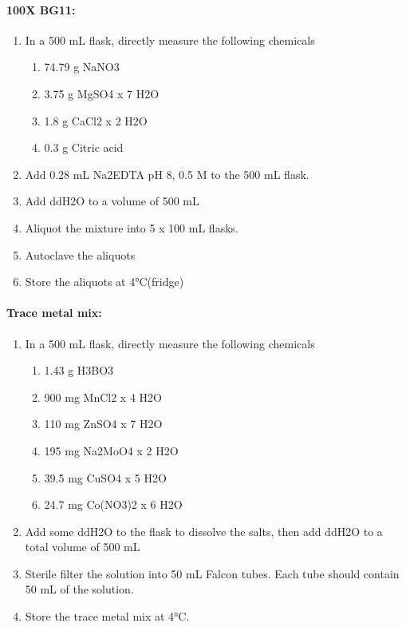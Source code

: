 \paragraph{100X BG11:}
\begin{enumerate}
    \item In a 500 mL flask, directly measure the following chemicals
\begin{enumerate}
    \item 74.79 g 	NaNO3
    \item 3.75 g 		MgSO4 x 7 H2O
    \item 1.8 g 		CaCl2 x 2 H2O
    \item 0.3 g 		Citric acid
\end{enumerate}
\item Add 0.28 mL Na2EDTA pH 8, 0.5 M to the 500 mL flask. 
\item Add ddH2O to a volume of 500 mL
\item Aliquot the mixture into 5 x 100 mL flasks.
\item Autoclave the aliquots 
\item Store the aliquots at 4°C(fridge)
\end{enumerate}

\paragraph{Trace metal mix:}
\begin{enumerate}
    \item In a 500 mL flask, directly measure the following chemicals
    \begin{enumerate}
        \item 1.43 g 		H3BO3
        \item 900 mg	MnCl2 x 4 H2O
        \item 110 mg 	ZnSO4 x 7 H2O
        \item 195 mg 	Na2MoO4 x 2 H2O
        \item 39.5 mg 	CuSO4 x 5 H2O
        \item 24.7 mg 	Co(NO3)2 x 6 H2O
\end{enumerate}
\item Add some ddH2O to the flask to dissolve the salts, then add ddH2O to a total volume of 500 mL 
\item Sterile filter the solution into 50 mL Falcon tubes. Each tube should contain 50 mL of the solution. 
\item Store the trace metal mix at 4°C. 
\end{enumerate}

